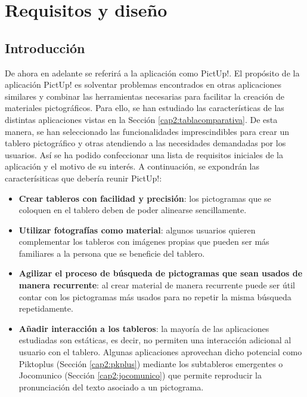 \chapter{Requisitos y diseño}
\label{cap:introduccion}



	

\label{cap1:sec:Motivacion}


\section{Introducción}
De ahora en adelante se referirá a la aplicación como PictUp!. El propósito de la aplicación PictUp! es solventar problemas encontrados en otras aplicaciones similares y combinar las herramientas necesarias para facilitar la creación de materiales pictográficos. Para ello, se han estudiado las características de las distintas aplicaciones vistas en la Sección \ref{cap2:tablacomparativa}. De esta manera, se han seleccionado las funcionalidades imprescindibles para crear un tablero pictográfico y otras atendiendo a las necesidades demandadas por los usuarios. Así se ha podido confeccionar una lista de requisitos iniciales de la aplicación y el motivo de su interés. A continuación, se expondrán las caracterísiticas que debería reunir PictUp!: 


\begin{itemize}
	\item \textbf{Crear tableros con facilidad y precisión}: los pictogramas que se coloquen en el tablero deben de poder alinearse sencillamente. 
	\item \textbf{Utilizar fotografías como material}: algunos usuarios quieren complementar los tableros con imágenes propias que pueden ser más familiares a la persona que se beneficie del tablero. 
	\item \textbf{Agilizar el proceso de búsqueda de pictogramas que sean usados de manera recurrente}: al crear material de manera recurrente puede ser útil contar con los pictogramas más usados para no repetir la misma búsqueda repetidamente. 
	\item \textbf{Añadir interacción a los tableros}: la mayoría de las aplicaciones estudiadas son estáticas, es decir, no permiten una interacción adicional al usuario con el tablero. Algunas aplicaciones aprovechan dicho potencial como Piktoplus (Sección \ref{cap2:pkplus}) mediante los subtableros emergentes o Jocomunico (Sección \ref{cap2:jocomunico}) que permite reproducir la pronunciación del texto asociado a un pictograma.
	
\end{itemize}







